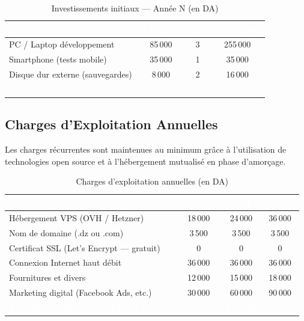 \documentclass[12pt,a4paper]{report}
\newcommand{\thdcell}[1]{%
  \cellcolor{tabhead}\textbf{\textcolor{white}{#1}}%
}
\begin{document}
\begin{table}[H]
  \centering
  \caption{Investissements initiaux — Année N (en DA)}
  \renewcommand{\arraystretch}{1.4}
  \begin{tabularx}{\linewidth}{Xccc}
    \toprule
    \rowcolor{primary}
    \thdcell{Libellé} & \thdcell{P.U (DA)} & \thdcell{Qté} &
    \thdcell{Total (DA)} \\
    \midrule

    PC / Laptop développement         & 85\,000 & 3 & 255\,000 \\
    \rowcolor{lightgray}
    Smartphone (tests mobile)         & 35\,000 & 1 &  35\,000 \\
    Disque dur externe (sauvegardes)  &  8\,000 & 2 &  16\,000 \\

    \midrule
    \rowcolor{primary}
    \multicolumn{3}{l}{\textcolor{white}{\textbf{TOTAL INVESTISSEMENT}}} &
    \textcolor{white}{\textbf{306\,000}} \\
    \bottomrule
  \end{tabularx}
\end{table}

\subsection{Charges d'Exploitation Annuelles}

Les charges récurrentes sont maintenues au minimum grâce à l'utilisation de
technologies open source et à l'hébergement mutualisé en phase d'amorçage.

\begin{table}[H]
  \centering
  \caption{Charges d'exploitation annuelles (en DA)}
  \renewcommand{\arraystretch}{1.4}
  \begin{tabularx}{\linewidth}{Xccc}
    \toprule
    \rowcolor{primary}
    \thdcell{Libellé} & \thdcell{Année N} & \thdcell{N+1} &
    \thdcell{N+2} \\
    \midrule

    Hébergement VPS (OVH / Hetzner)             & 18\,000 & 24\,000 & 36\,000 \\
    \rowcolor{lightgray}
    Nom de domaine (.dz ou .com)                &  3\,500 &  3\,500 &  3\,500 \\
    Certificat SSL (Let's Encrypt — gratuit)    &       0 &       0 &       0 \\
    \rowcolor{lightgray}
    Connexion Internet haut débit               & 36\,000 & 36\,000 & 36\,000 \\
    Fournitures et divers                       & 12\,000 & 15\,000 & 18\,000 \\
    \rowcolor{lightgray}
    Marketing digital (Facebook Ads, etc.)      & 30\,000 & 60\,000 & 90\,000 \\
    \midrule
    \rowcolor{primary}
    \textcolor{white}{\textbf{TOTAL CHARGES EXPLOITATION}} &
    \textcolor{white}{\textbf{99\,500}} &
    \textcolor{white}{\textbf{138\,500}} &
    \textcolor{white}{\textbf{183\,500}} \\
    \bottomrule
  \end{tabularx}
\end{table}
\end{document}
